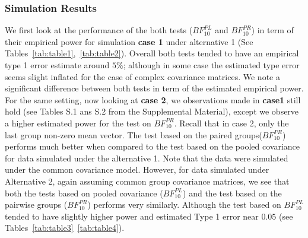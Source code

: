 \documentclass[times,sort&compress,3p]{elsarticle}
\theoremstyle{plain}%
\theoremstyle{definition}
\begin{document}
\subsubsection{Simulation Results}
We first look at the performance of the both tests ($BF^{PL}_{10}$ and $BF^{PR}_{10}$) in term of their empirical power for simulation {\bf case 1} under alternative 1 (See Tables~\ref{tab:table1},~\ref{tab:table2}). 
Overall both tests tended to have an empirical type 1 error estimate around $5\%$; although in  some case the estimated type error seems slight inflated for the case of complex covariance matrices. 
We note a significant difference between both tests in term of the estimated empirical power. 
For the same setting, now looking at {\bf case 2}, we observations made in {\bf case1} still hold (see Tables S.1 ans S.2 from the Supplemental Material), except we observe a higher estimated power for the test on $BF^{PR}_{10}$. Recall that in case 2, only the last group non-zero mean vector. 
The test based on the paired groups($BF^{PR}_{10}$) performs much better when compared to the test based on the pooled covariance for data simulated under the alternative 1. 
Note that the data were simulated under the common covariance model. 
However, for data simulated under Alternative 2, again assuming common group covariance matrices, we see that both the tests based on pooled covariance ($BF^{PL}_{10}$) and the test based on the pairwise groups ($BF^{PR}_{10}$) performs very similarly. Although the test based on $BF^{PL}_{10}$ tended to have slightly higher power and estimated Type 1 error near $0.05$ (see Tables~\ref{tab:table3}~\ref{tab:table4}).
\end{document}

